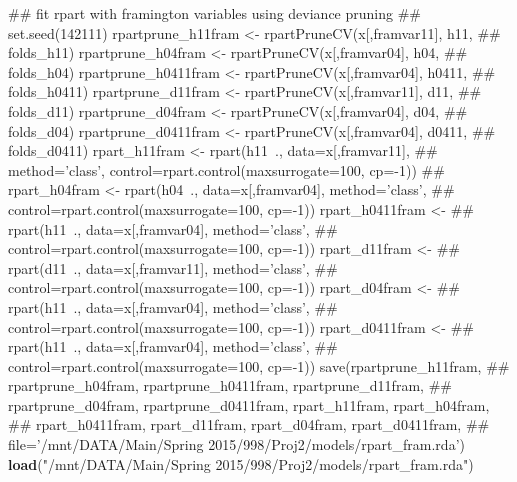 \documentclass[11pt,]{article}
\newenvironment{Shaded}{\begin{snugshade}}{\end{snugshade}}
\newcommand{\KeywordTok}[1]{\textcolor[rgb]{0.13,0.29,0.53}{\textbf{{#1}}}}
\newcommand{\StringTok}[1]{\textcolor[rgb]{0.31,0.60,0.02}{{#1}}}
\newcommand{\NormalTok}[1]{{#1}}
\begin{document}
\begin{Shaded}
\begin{Highlighting}[]
{\NormalTok{## fit rpart with framington variables using deviance pruning}
\NormalTok{## set.seed(142111) rpartprune_h11fram <- rpartPruneCV(x[,framvar11], h11,}
\NormalTok{## folds_h11) rpartprune_h04fram <- rpartPruneCV(x[,framvar04], h04,}
\NormalTok{## folds_h04) rpartprune_h0411fram <- rpartPruneCV(x[,framvar04], h0411,}
\NormalTok{## folds_h0411) rpartprune_d11fram <- rpartPruneCV(x[,framvar11], d11,}
\NormalTok{## folds_d11) rpartprune_d04fram <- rpartPruneCV(x[,framvar04], d04,}
\NormalTok{## folds_d04) rpartprune_d0411fram <- rpartPruneCV(x[,framvar04], d0411,}
\NormalTok{## folds_d0411) rpart_h11fram <- rpart(h11~., data=x[,framvar11],}
\NormalTok{## method='class', control=rpart.control(maxsurrogate=100, cp=-1))}
\NormalTok{## rpart_h04fram <- rpart(h04~., data=x[,framvar04], method='class',}
\NormalTok{## control=rpart.control(maxsurrogate=100, cp=-1)) rpart_h0411fram <-}
\NormalTok{## rpart(h11~., data=x[,framvar04], method='class',}
\NormalTok{## control=rpart.control(maxsurrogate=100, cp=-1)) rpart_d11fram <-}
\NormalTok{## rpart(d11~., data=x[,framvar11], method='class',}
\NormalTok{## control=rpart.control(maxsurrogate=100, cp=-1)) rpart_d04fram <-}
\NormalTok{## rpart(h11~., data=x[,framvar04], method='class',}
\NormalTok{## control=rpart.control(maxsurrogate=100, cp=-1)) rpart_d0411fram <-}
\NormalTok{## rpart(h11~., data=x[,framvar04], method='class',}
\NormalTok{## control=rpart.control(maxsurrogate=100, cp=-1)) save(rpartprune_h11fram,}
\NormalTok{## rpartprune_h04fram, rpartprune_h0411fram, rpartprune_d11fram,}
\NormalTok{## rpartprune_d04fram, rpartprune_d0411fram, rpart_h11fram, rpart_h04fram,}
\NormalTok{## rpart_h0411fram, rpart_d11fram, rpart_d04fram, rpart_d0411fram,}
\NormalTok{## file='/mnt/DATA/Main/Spring 2015/998/Proj2/models/rpart_fram.rda')}
\KeywordTok{load}\NormalTok{(}\StringTok{"/mnt/DATA/Main/Spring 2015/998/Proj2/models/rpart_fram.rda"}\NormalTok{)}

}
\end{Highlighting}
\end{Shaded}
\end{document}
